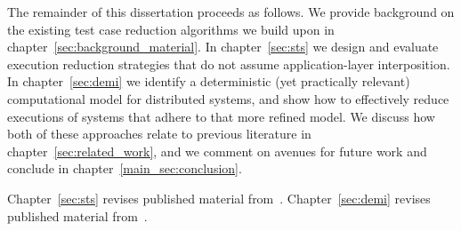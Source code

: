 The remainder of this dissertation proceeds as follows. We provide background
on the existing test case reduction algorithms we build upon in
chapter~\ref{sec:background_material}. In chapter~\ref{sec:sts} we design and
evaluate execution reduction strategies that do not assume application-layer
interposition. In chapter~\ref{sec:demi} we identify a deterministic (yet
practically relevant)
computational model for distributed systems, and show how to effectively
reduce executions of systems that adhere to that more refined model. We discuss how both of
these approaches relate to previous literature in
chapter~\ref{sec:related_work}, and we comment on avenues for
future work and conclude in chapter~\ref{main_sec:conclusion}.

Chapter~\ref{sec:sts} revises published material from~\cite{sts2014}.
Chapter~\ref{sec:demi} revises published material from~\cite{Scott:2015:DEMi}.


